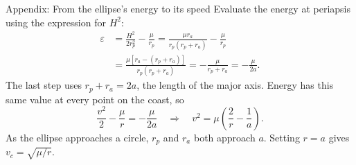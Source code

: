 \documentclass[aspectratio=43,10pt]{beamer}
\begin{document}
\begin{frame}{Appendix: From the ellipse's energy to its speed}
Evaluate the energy at periapsis using the expression for $H^2$:
\[
 \begin{aligned}
 \varepsilon
 &=\frac{H^2}{2r_p^2}-\frac{\mu}{r_p}
 =\frac{\mu r_a}{r_p(r_p+r_a)}-\frac{\mu}{r_p}\\[4pt]
 &=\frac{\mu[r_a-(r_p+r_a)]}{r_p(r_p+r_a)}
 =-\frac{\mu}{r_p+r_a}=-\frac{\mu}{2a}.
 \end{aligned}
\]
The last step uses $r_p+r_a=2a$, the length of the major axis. Energy has this same value at every point on the coast, so
\[
 \frac{v^2}{2}-\frac{\mu}{r}=-\frac{\mu}{2a}
 \quad\Longrightarrow\quad
 \boxed{v^2=\mu\!\left(\frac{2}{r}-\frac{1}{a}\right)} .
\]
As the ellipse approaches a circle, $r_p$ and $r_a$ both approach $a$. Setting $r=a$ gives $v_c=\sqrt{\mu/r}$.
\end{frame}
\end{document}
